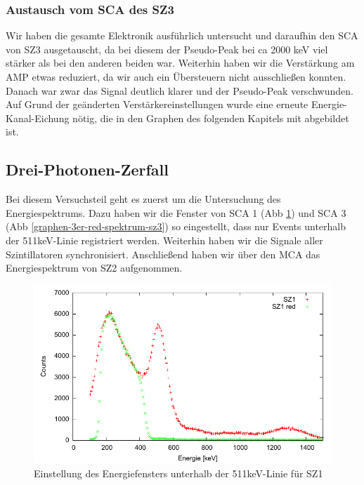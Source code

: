  

\subsubsection{Austausch vom SCA des SZ3}
Wir haben die gesamte Elektronik ausführlich untersucht und daraufhin den SCA von SZ3 ausgetauscht, da bei diesem der Pseudo-Peak bei ca 2000 keV viel stärker als bei den anderen beiden war. Weiterhin haben wir die Verstärkung am AMP etwas reduziert, da wir auch ein Übersteuern nicht ausschließen konnten. Danach war zwar das Signal deutlich klarer und der Pseudo-Peak verschwunden. Auf Grund der geänderten Verstärkereinstellungen wurde eine erneute Energie-Kanal-Eichung nötig, die in den Graphen des folgenden Kapitels mit abgebildet ist. 

\subsection{Drei-Photonen-Zerfall}

Bei diesem Versuchsteil geht es zuerst um die Untersuchung des Energiespektrums. Dazu haben wir die Fenster von SCA 1 (Abb \ref{graphen-3er-red-spektrum-sz1}) und SCA 3 (Abb \ref{graphen-3er-red-spektrum-sz3}) so eingestellt, dass nur Events unterhalb der 511keV-Linie registriert werden. Weiterhin haben wir die Signale aller Szintillatoren synchronisiert. Anschließend haben wir über den MCA das Energiespektrum von SZ2 aufgenommen. 
\begin{figure}[H]
 \includegraphics[width=\textwidth]{Graphen/3er/red-spektrum-sz1.pdf}
 \caption{Einstellung des Energiefensters unterhalb der 511keV-Linie für SZ1}
 \label{graphen-3er-red-spektrum-sz1}
\end{figure}


